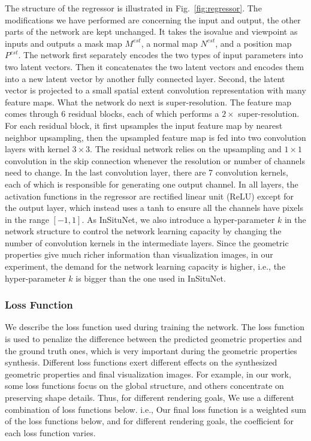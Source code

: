 \documentclass[journal]{vgtc}                %
\begin{document}
The structure of the regressor is illustrated in Fig.~\ref{fig:regressor}. The modifications we have performed are concerning the input and output, the other parts of the network are kept unchanged. It takes the isovalue and viewpoint as inputs and outputs a mask map $M^{est}$, a normal map $N^{est}$, and a position map $P^{est}$. The network first separately encodes the two types of input parameters into two latent vectors. Then it concatenates the two latent vectors and encodes them into a new latent vector by another fully connected layer. Second, the latent vector is projected to a small spatial extent convolution representation with many feature maps. What the network do next is super-resolution. The feature map comes through $6$ residual blocks, each of which performs a $2 \times$ super-resolution. For each residual block, it first upsamples the input feature map by nearest neighbor upsampling, then the upsampled feature map is fed into two convolution layers with kernel $3 \times 3$. The residual network relies on the upsampling and $1 \times 1$ convolution in the skip connection whenever the resolution or number of channels need to change. In the last convolution layer, there are 7 convolution kernels, each of which is responsible for generating one output channel. In all layers, the activation functions in the regressor are rectified linear unit (ReLU) except for the output layer, which instead uses a tanh to ensure all the channels have pixels in the range $[-1, 1]$.
As InSituNet, we also introduce a hyper-parameter $k$ in the network structure to control the network learning capacity by changing the number of convolution kernels in the intermediate layers. Since the geometric properties give much richer information than visualization images, in our experiment, the demand for the network learning capacity is higher, i.e., the hyper-parameter $k$ is bigger than the one used in InSituNet. 

\subsubsection{Loss Function}

We describe the loss function used during training the network. The loss function is used to penalize the difference between the predicted geometric properties and the ground truth ones, which is very important during the geometric properties synthesis.  Different loss functions exert different effects on the synthesized geometric properties and final visualization images.  For example, in our work, some loss functions focus on the global structure, and others concentrate on preserving shape details. Thus, for different rendering goals, We use a different combination of loss functions below. i.e., Our final loss function is a weighted sum of the loss functions below, and for different rendering goals, the coefficient for each loss function varies.    
\end{document}
